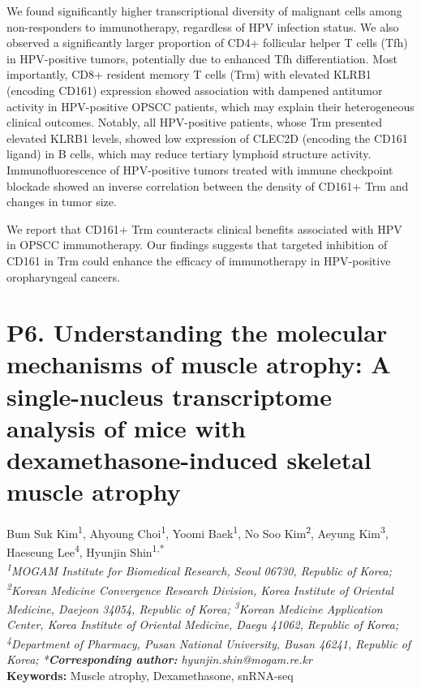 We found significantly higher transcriptional diversity of malignant cells among non-responders to immunotherapy, regardless of HPV infection status. We also observed a significantly larger proportion of CD4+ follicular helper T cells (Tfh) in HPV-positive tumors, potentially due to enhanced Tfh differentiation. Most importantly, CD8+ resident memory T cells (Trm) with elevated KLRB1 (encoding CD161) expression showed association with dampened antitumor activity in HPV-positive OPSCC patients, which may explain their heterogeneous clinical outcomes. Notably, all HPV-positive patients, whose Trm presented elevated KLRB1 levels, showed low expression of CLEC2D (encoding the CD161 ligand) in B cells, which may reduce tertiary lymphoid structure activity. Immunofluorescence of HPV-positive tumors treated with immune checkpoint blockade showed an inverse correlation between the density of CD161+ Trm and changes in tumor size.

We report that CD161+ Trm counteracts clinical benefits associated with HPV in OPSCC immunotherapy. Our findings suggests that targeted inhibition of CD161 in Trm could enhance the efficacy of immunotherapy in HPV-positive oropharyngeal cancers.
\newpage

\section*{P6. Understanding the molecular mechanisms of muscle atrophy: A single-nucleus transcriptome analysis of mice with dexamethasone-induced skeletal muscle atrophy}

\begin{center}
Bum Suk Kim\textsuperscript{1}, Ahyoung Choi\textsuperscript{1}, Yoomi Baek\textsuperscript{1}, No Soo Kim\textsuperscript{2}, Aeyung Kim\textsuperscript{3}, Haeseung Lee\textsuperscript{4}, Hyunjin Shin\textsuperscript{1,*} \\
\vspace{0.3cm}
\textit{\textsuperscript{1}MOGAM Institute for Biomedical Research, Seoul 06730, Republic of Korea; \textsuperscript{2}Korean Medicine Convergence Research Division, Korea Institute of Oriental Medicine, Daejeon 34054, Republic of Korea; \textsuperscript{3}Korean Medicine Application Center, Korea Institute of Oriental Medicine, Daegu 41062, Republic of Korea; \textsuperscript{4}Department of Pharmacy, Pusan National University, Busan 46241, Republic of Korea; *\textbf{Corresponding author:} hyunjin.shin@mogam.re.kr} \\
\vspace{0.3cm}
\textbf{Keywords:} Muscle atrophy, Dexamethasone, snRNA-seq
\end{center}

